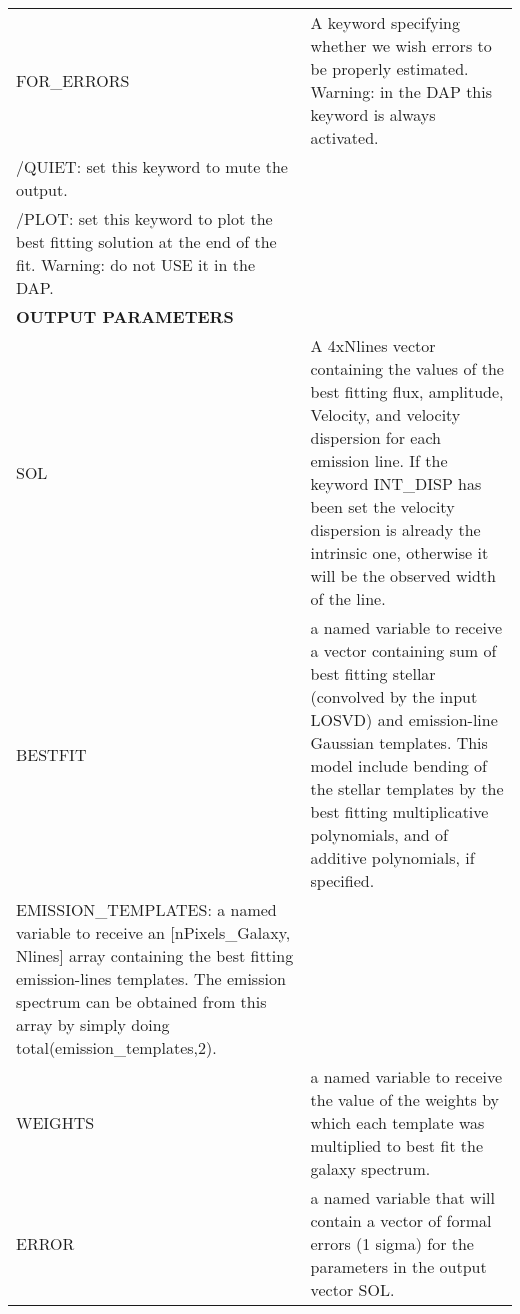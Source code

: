 \begin{center}
\begin{longtable}{p{2.7cm}| p{11.1cm}}
%
FOR\_ERRORS & A keyword specifying whether we wish errors to be
       properly estimated. Warning: in the DAP this keyword is always activated.\\
%
   /QUIET: set this keyword to mute the output.\\
%
  /PLOT: set this keyword to plot the best fitting solution at the end
  of the fit. Warning: do not USE it in the DAP.\\
%
\hline
{\bf OUTPUT PARAMETERS}  & \\
\hline
SOL & A 4xNlines vector containing the values of the best fitting
       flux, amplitude, Velocity, and velocity dispersion for each
       emission line. If the keyword INT\_DISP has been set the velocity
       dispersion is already the intrinsic one, otherwise it will be the
       observed width of the line.\\
%
BESTFIT & a named variable to receive a vector containing sum of
       best fitting stellar (convolved by the input LOSVD) and
       emission-line Gaussian templates. This model include bending
       of the stellar templates by the best fitting multiplicative
       polynomials, and of additive polynomials, if specified.\\
%   
EMISSION\_TEMPLATES: a named variable to receive an
       [nPixels\_Galaxy, Nlines] array containing the best fitting emission-lines
       templates. The emission spectrum can be obtained from this
       array by simply doing total(emission\_templates,2).\\
%
WEIGHTS& a named variable to receive the value of the weights by which
       each template was multiplied to best fit the galaxy spectrum.\\
%
ERROR& a named variable that will contain a vector of formal
       errors (1 sigma) for the parameters in the output vector
       SOL.


\end{longtable}
\end{center}
